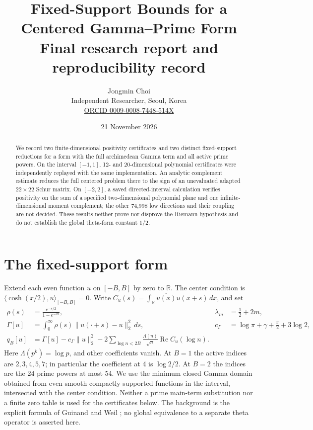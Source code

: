 \documentclass[11pt]{article}
\title{Fixed-Support Bounds for a Centered Gamma--Prime Form\\\large Final research report and reproducibility record}
\author{Jongmin Choi\\Independent Researcher, Seoul, Korea\\\href{https://orcid.org/0009-0008-7448-514X}{ORCID 0009-0008-7448-514X}}
\date{21 November 2026}
\newcommand{\R}{\mathbb R}
\newcommand{\ip}[2]{\langle #1,#2\rangle}
\begin{document}
\maketitle
\begin{abstract}
We record two finite-dimensional positivity certificates and two distinct fixed-support reductions for a form with the full archimedean Gamma term and all active prime powers. On the interval $[-1,1]$, 12- and 20-dimensional polynomial certificates were independently replayed with the same implementation. An analytic complement estimate reduces the full centered problem there to the sign of an unevaluated adapted $22\times22$ Schur matrix. On $[-2,2]$, a saved directed-interval calculation verifies positivity on the sum of a specified two-dimensional polynomial plane and one infinite-dimensional moment complement; the other 74,998 low directions and their coupling are not decided. These results neither prove nor disprove the Riemann hypothesis and do not establish the global theta-form constant $1/2$.
\end{abstract}

\section{The fixed-support form}
Extend each even function $u$ on $[-B,B]$ by zero to $\R$. The center condition is $\ip{\cosh(x/2)}u_{[-B,B]}=0$. Write $C_u(s)=\int_{\R}\overline{u(x)}u(x+s)\,dx$, and set
\begin{align*}
 \rho(s)&=\frac{e^{-s/2}}{1-e^{-2s}}, & \lambda_m&=\tfrac12+2m,\\
 \Gamma[u]&=\int_0^\infty\rho(s)\|u(\cdot+s)-u\|_2^2\,ds,
 & c_\Gamma&=\log\pi+\gamma+\frac\pi2+3\log2,\\
 q_B[u]&=\Gamma[u]-c_\Gamma\|u\|_2^2-
 2\!\sum_{\log n<2B}\frac{\Lambda(n)}{\sqrt n}\operatorname{Re} C_u(\log n).
\end{align*}
Here $\Lambda(p^k)=\log p$, and other coefficients vanish. At $B=1$ the active indices are $2,3,4,5,7$; in particular the coefficient at 4 is $\log2/2$. At $B=2$ the indices are the 24 prime powers at most 54. We use the minimum closed Gamma domain obtained from even smooth compactly supported functions in the interval, intersected with the center condition. Neither a prime main-term substitution nor a finite zero table is used for the certificates below. The background is the explicit formula of Guinand and Weil \cite{guinand,weil}; no global equivalence to a separate theta operator is asserted here.
\end{document}
